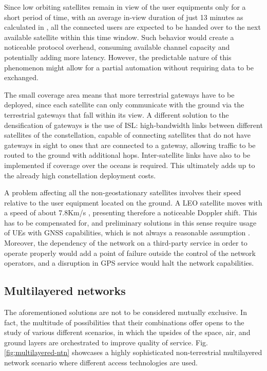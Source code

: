 Since low orbiting satellites remain in view of the user equipments only for a short period of time, with an average in-view duration of just 13 minutes as calculated in \cite{regional-coverage-analysis-leo}, all the connected users are expected to be handed over to the next available satellite within this time window. Such behavior would create a noticeable protocol overhead, consuming available channel capacity and potentially adding more latency. However, the predictable nature of this phenomenon might allow for a partial automation without requiring data to be exchanged.

The small coverage area means that more terrestrial gateways have to be deployed, since each satellite can only communicate with the ground via the terrestrial gateways that fall within its view. A different solution to the densification of gateways is the use of \ac{ISL}: high-bandwidth links between different satellites of the constellation, capable of connecting satellites that do not have gateways in sight to ones that are connected to a gateway, allowing traffic to be routed to the ground with additional hops. Inter-satellite links have also to be implemented if coverage over the oceans is required. This ultimately adds up to the already high constellation deployment costs.

A problem affecting all the non-geostationary satellites involves their speed relative to the user equipment located on the ground. A \ac{LEO} satellite moves with a speed of about 7.8Km/s \cite{leo-definition-theory-facts}, presenting therefore a noticeable Doppler shift. This has to be compensated for, and preliminary solutions in this sense require usage of \ac{UE}s with GNSS capabilities, which is not always a reasonable assumption \cite{satellite-communication-mmwave-giordani, 3gpp-tr-38.821}. Moreover, the dependency of the network on a third-party service in order to operate properly would add a point of failure outside the control of the network operators, and a disruption in GPS service would halt the network capabilities.

\subsection{Multilayered networks}
The aforementioned solutions are not to be considered mutually exclusive. In fact, the multitude of possibilities that their combinations offer opens to the study of various different scenarios, in which the upsides of the space, air, and ground layers are orchestrated to improve quality of service. Fig. \ref{fig:multilayered-ntn} showcases a highly sophisticated non-terrestrial multilayered network scenario where different access technologies are used.

